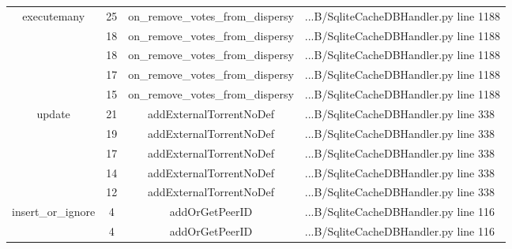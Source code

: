\begin{table}[]
{\begin{tabular}{|c|c|c|l|}
			\multicolumn{1}{|c|}{\multirow{5}{*}{executemany}} & \multicolumn{1}{c|}{25} & \multicolumn{1}{c|}{on\_remove\_votes\_from\_dispersy} & \multicolumn{1}{l|}{...B/SqliteCacheDBHandler.py line 1188} \\ \cline{2-4}
			\multicolumn{1}{|c|}{} & \multicolumn{1}{c|}{18}  & \multicolumn{1}{c|}{on\_remove\_votes\_from\_dispersy}  & \multicolumn{1}{l|}{...B/SqliteCacheDBHandler.py line 1188}  \\ \cline{2-4} 
			\multicolumn{1}{|c|}{} & \multicolumn{1}{c|}{18}  & \multicolumn{1}{c|}{on\_remove\_votes\_from\_dispersy}  & \multicolumn{1}{l|}{...B/SqliteCacheDBHandler.py line 1188}  \\ \cline{2-4} 
			\multicolumn{1}{|c|}{} & \multicolumn{1}{c|}{17}  & \multicolumn{1}{c|}{on\_remove\_votes\_from\_dispersy}  & \multicolumn{1}{l|}{...B/SqliteCacheDBHandler.py line 1188}  \\ \cline{2-4} 
			\multicolumn{1}{|c|}{} & \multicolumn{1}{c|}{15}  & \multicolumn{1}{c|}{on\_remove\_votes\_from\_dispersy}  & \multicolumn{1}{l|}{...B/SqliteCacheDBHandler.py line 1188}  \\ \hline 
			\multicolumn{1}{|c|}{\multirow{5}{*}{update}} & \multicolumn{1}{c|}{21} & \multicolumn{1}{c|}{addExternalTorrentNoDef} & \multicolumn{1}{l|}{...B/SqliteCacheDBHandler.py line 338} \\ \cline{2-4}
			\multicolumn{1}{|c|}{} & \multicolumn{1}{c|}{19}  & \multicolumn{1}{c|}{addExternalTorrentNoDef}  & \multicolumn{1}{l|}{...B/SqliteCacheDBHandler.py line 338}  \\ \cline{2-4} 
			\multicolumn{1}{|c|}{} & \multicolumn{1}{c|}{17}  & \multicolumn{1}{c|}{addExternalTorrentNoDef}  & \multicolumn{1}{l|}{...B/SqliteCacheDBHandler.py line 338}  \\ \cline{2-4} 
			\multicolumn{1}{|c|}{} & \multicolumn{1}{c|}{14}  & \multicolumn{1}{c|}{addExternalTorrentNoDef}  & \multicolumn{1}{l|}{...B/SqliteCacheDBHandler.py line 338}  \\ \cline{2-4} 
			\multicolumn{1}{|c|}{} & \multicolumn{1}{c|}{12}  & \multicolumn{1}{c|}{addExternalTorrentNoDef}  & \multicolumn{1}{l|}{...B/SqliteCacheDBHandler.py line 338}  \\ \hline 
			\multicolumn{1}{|c|}{\multirow{5}{*}{insert\_or\_ignore}} & \multicolumn{1}{c|}{4} & \multicolumn{1}{c|}{addOrGetPeerID} & \multicolumn{1}{l|}{...B/SqliteCacheDBHandler.py line 116} \\ \cline{2-4}
			\multicolumn{1}{|c|}{} & \multicolumn{1}{c|}{4}  & \multicolumn{1}{c|}{addOrGetPeerID}  & \multicolumn{1}{l|}{...B/SqliteCacheDBHandler.py line 116}  \\ \cline{2-4} 

\end{tabular}}
\end{table}

